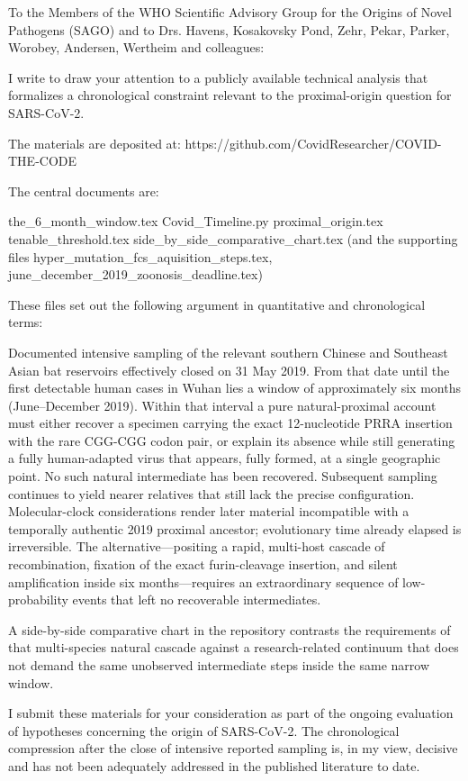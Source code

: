 To the Members of the WHO Scientific Advisory Group for the Origins of Novel Pathogens (SAGO)  
and to Drs. Havens, Kosakovsky Pond, Zehr, Pekar, Parker, Worobey, Andersen, Wertheim and colleagues:

I write to draw your attention to a publicly available technical analysis that formalizes a chronological constraint relevant to the proximal-origin question for SARS-CoV-2.

The materials are deposited at:  
https://github.com/CovidResearcher/COVID-THE-CODE

The central documents are:

the_6_month_window.tex  
Covid_Timeline.py  
proximal_origin.tex  
tenable_threshold.tex  
side_by_side_comparative_chart.tex  
(and the supporting files hyper_mutation_fcs_aquisition_steps.tex, june_december_2019_zoonosis_deadline.tex)

These files set out the following argument in quantitative and chronological terms:

Documented intensive sampling of the relevant southern Chinese and Southeast Asian bat reservoirs effectively closed on 31 May 2019.  
From that date until the first detectable human cases in Wuhan lies a window of approximately six months (June–December 2019).  
Within that interval a pure natural-proximal account must either recover a specimen carrying the exact 12-nucleotide PRRA insertion with the rare CGG-CGG codon pair, or explain its absence while still generating a fully human-adapted virus that appears, fully formed, at a single geographic point.  
No such natural intermediate has been recovered. Subsequent sampling continues to yield nearer relatives that still lack the precise configuration.  
Molecular-clock considerations render later material incompatible with a temporally authentic 2019 proximal ancestor; evolutionary time already elapsed is irreversible.  
The alternative—positing a rapid, multi-host cascade of recombination, fixation of the exact furin-cleavage insertion, and silent amplification inside six months—requires an extraordinary sequence of low-probability events that left no recoverable intermediates.

A side-by-side comparative chart in the repository contrasts the requirements of that multi-species natural cascade against a research-related continuum that does not demand the same unobserved intermediate steps inside the same narrow window.

I submit these materials for your consideration as part of the ongoing evaluation of hypotheses concerning the origin of SARS-CoV-2. The chronological compression after the close of intensive reported sampling is, in my view, decisive and has not been adequately addressed in the published literature to date.

